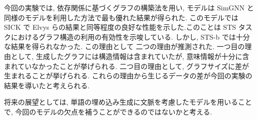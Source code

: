 \documentclass{abst}
\begin{document}
{\par 今回の実験では, 依存関係に基づくグラフの構築法を用い, モデルは SimGNN と同様のモデルを利用した方法で最も優れた結果が得られた.
このモデルでは SICK で Elvys らの結果と同等程度の良好な性能を示した.このことは STS タスクにおけるグラフ構造の利用の有効性を示唆している.
しかし, STS-b では十分な結果を得られなかった.
この理由として 二つの理由が推測された.
一つ目の理由として, 生成したグラフには構造情報は含まれていたが, 意味情報が十分に含まれていなかったことが挙げられる.
二つ目の理由として, グラフサイズに差が生まれることが挙げられる.
これらの理由から生じるデータの差が今回の実験の結果を導いたと考えられる.
\par 将来の展望としては, 単語の埋め込み生成に文脈を考慮したモデルを用いることで, 今回のモデルの欠点を補うことができるのではないかと考える.
}
\end{document}

